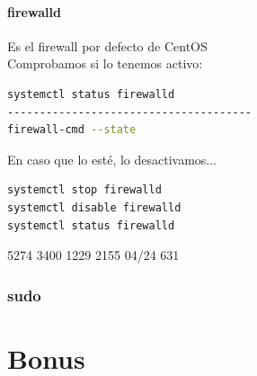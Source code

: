 \documentclass[a4paper]{article}
\begin{document}
\paragraph{firewalld}
Es el firewall por defecto de CentOS
\\
Comprobamos si lo tenemos activo:
\begin{lstlisting}[language=Bash]
systemctl status firewalld
--------------------------------------
firewall-cmd --state
\end{lstlisting}
En caso que lo esté, lo desactivamos...
\begin{lstlisting}[language=Bash]
systemctl stop firewalld
systemctl disable firewalld
systemctl status firewalld
\end{lstlisting}

\pagebreak




5274 3400 1229 2155 04/24 631

\subsubsection{sudo}

\section{Bonus}
\end{document}
